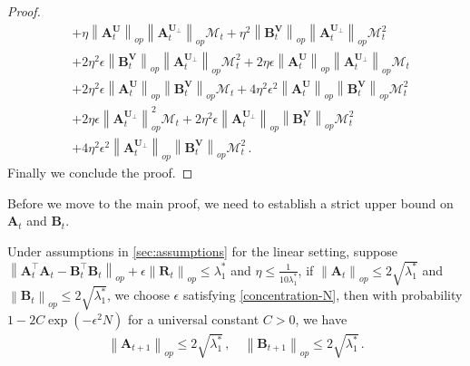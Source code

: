 \begin{proof}
\begin{align*}
        & + \eta \left\|\bm A^{\bm U}_{t}\right\|_{op}\left\|\bm A^{\bm U_\perp}_{t}\right\|_{op}\mathcal{M}_t+\eta^2 \left\|\bm B^{\bm V}_{t}\right\|_{op}\left\|\bm A^{\bm U_\perp}_{t}\right\|_{op}\mathcal{M}_t^2\\
        & +2\eta^2 \epsilon \left\|\bm B^{\bm V}_{t}\right\|_{op}\left\|\bm A^{\bm U_\perp}_{t}\right\|_{op}\mathcal{M}_t^2+2\eta \epsilon \left\|\bm A^{\bm U}_{t}\right\|_{op}\left\|\bm A^{\bm U_\perp}_{t}\right\|_{op} \mathcal{M}_t\\
        & + 2 \eta^2 \epsilon \left\|\bm A^{\bm U}_{t}\right\|_{op}\left\|\bm B^{\bm V}_{t}\right\|_{op} \mathcal{M}_t + 4 \eta^2 \epsilon^2 \left\|\bm A^{\bm U}_{t}\right\|_{op}\left\|\bm B^{\bm V}_{t}\right\|_{op} \mathcal{M}_t^2\\
        & + 2 \eta \epsilon \left\|\bm A^{\bm U_\perp}_{t}\right\|_{op}^2\mathcal{M}_t+2\eta^2 \epsilon \left\|\bm A^{\bm U_\perp}_{t}\right\|_{op}\left\|\bm B^{\bm V}_{t}\right\|_{op}\mathcal{M}_t^2\\
        & + 4 \eta^2 \epsilon^2 \left\|\bm A^{\bm U_\perp}_{t}\right\|_{op}\left\|\bm B^{\bm V}_{t}\right\|_{op} \mathcal{M}_t^2\,.
    \end{align*}
    Finally we conclude the proof.
\end{proof}
Before we move to the main proof, we need to establish a strict upper bound on $\bm A_t$ and $\bm B_t$.
\begin{lemma}
\label{mahdi-upper}
    Under assumptions in \cref{sec:assumptions} for the linear setting, suppose $\left\|\bm A_t^{\!\top}\bm A_t - \bm B_t^{\!\top}\bm B_t\right\|_{op} + \epsilon \left\|\bm R_t\right\|_{op} \leq \lambda_1^*$ and $\eta\leq \frac{1}{10\lambda_1^*}$, if $\left\|\bm A_{t}\right\|_{op}\leq 2\sqrt{\lambda_1^*}$ and $\left\|\bm B_{t}\right\|_{op}\leq 2\sqrt{\lambda_1^*}$, we choose $\epsilon$ satisfying \cref{concentration-N}, then with probability $1- 2C\exp(-\epsilon^2 N)$ for a universal constant $C>0$, we have
    \begin{align*}
        \left\|\bm A_{t+1}\right\|_{op}\leq 2\sqrt{\lambda_1^*}\,,\quad\left\|\bm B_{t+1}\right\|_{op}\leq 2\sqrt{\lambda_1^*}\,.
    \end{align*}
\end{lemma}
